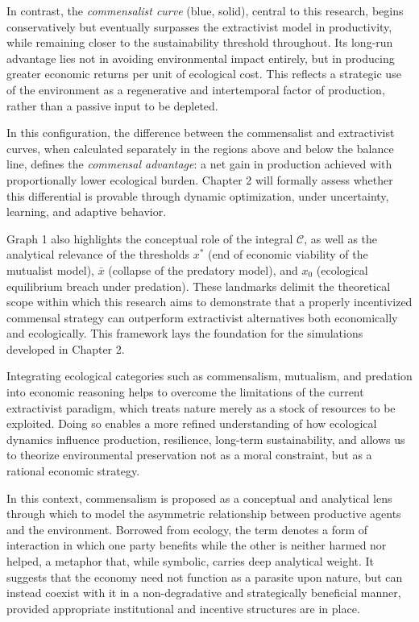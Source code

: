 In contrast, the \textit{commensalist curve} (blue, solid), central to this research, begins conservatively but eventually surpasses the extractivist model in productivity, while remaining closer to the sustainability threshold throughout. Its long-run advantage lies not in avoiding environmental impact entirely, but in producing greater economic returns per unit of ecological cost. This reflects a strategic use of the environment as a regenerative and intertemporal factor of production, rather than a passive input to be depleted.

In this configuration, the difference between the commensalist and extractivist curves, when calculated separately in the regions above and below the balance line, defines the \textit{commensal advantage}: a net gain in production achieved with proportionally lower ecological burden. Chapter 2 will formally assess whether this differential is provable through dynamic optimization, under uncertainty, learning, and adaptive behavior.

Graph 1 also highlights the conceptual role of the integral $\mathcal{C}$, as well as the analytical relevance of the thresholds $x^*$ (end of economic viability of the mutualist model), $\bar{x}$ (collapse of the predatory model), and $x_0$ (ecological equilibrium breach under predation). These landmarks delimit the theoretical scope within which this research aims to demonstrate that a properly incentivized commensal strategy can outperform extractivist alternatives both economically and ecologically. This framework lays the foundation for the simulations developed in Chapter 2.

Integrating ecological categories such as commensalism, mutualism, and predation into economic reasoning helps to overcome the limitations of the current extractivist paradigm, which treats nature merely as a stock of resources to be exploited. Doing so enables a more refined understanding of how ecological dynamics influence production, resilience, long-term sustainability, and allows us to theorize environmental preservation not as a moral constraint, but as a rational economic strategy.

In this context, commensalism is proposed as a conceptual and analytical lens through which to model the asymmetric relationship between productive agents and the environment. Borrowed from ecology, the term denotes a form of interaction in which one party benefits while the other is neither harmed nor helped, a metaphor that, while symbolic, carries deep analytical weight. It suggests that the economy need not function as a parasite upon nature, but can instead coexist with it in a non-degradative and strategically beneficial manner, provided appropriate institutional and incentive structures are in place. 

